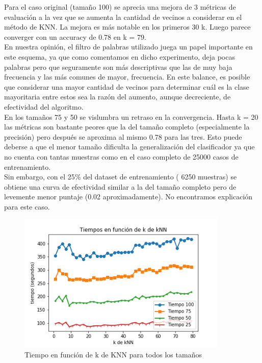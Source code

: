 Para el caso original (tamaño 100) se aprecia una mejora de 3 métricas de evaluación a la vez que se aumenta la cantidad de vecinos a considerar en el método de KNN. La mejora es más notable en los primeros 30 k. Luego parece converger con un accuracy de 0.78 en k = 79. \\

En nuestra opinión, el filtro de palabras utilizado juega un papel importante en este esquema, ya que como comentamos en dicho experimento, deja pocas palabras pero que seguramente son más descriptivas que las de muy baja frecuencia y las más comunes de mayor, frecuencia. En este balance, es posible que considerar una mayor cantidad de vecinos para determinar cuál es la clase mayoritaria entre estos sea la razón del aumento, aunque decreciente, de efectividad del algoritmo. \\

En los tamaños 75 y 50 se vislumbra un retraso en la convergencia. Hasta k = 20 las métricas son bastante peores que la del tamaño completo (especialmente la precisión) pero después se aproxima al mismo 0.78 para las tres. Esto puede deberse a que el menor tamaño dificulta la generalización del clasificador ya que no cuenta con tantas muestras como en el caso completo de 25000 casos de entrenamiento. \\
Sin embargo, con el 25$\%$ del dataset de entrenamiento ( 6250 muestras) se obtiene una curva de efectividad similar a la del tamaño completo pero de levemente menor puntaje (0.02 aproximadamente). No encontramos explicación para este caso. \\

\begin{figure}[H]
     \begin{center}
     \includegraphics[width=100mm]{img/k_tiempos.png} 
    \end{center}
\caption{Tiempo en función de k de KNN para todos los tamaños} \label{fig:exp4-tiempo-knn}
\end{figure}

